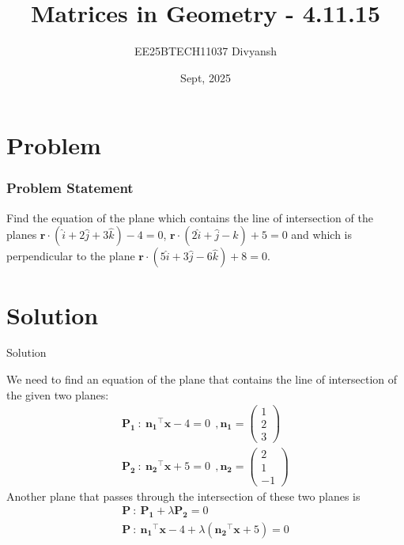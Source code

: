 \documentclass{beamer}
\title{Matrices in Geometry - 4.11.15}
\author{EE25BTECH11037  Divyansh}
\date{Sept, 2025}
\let\vec\mathbf
\providecommand{\brak}[1]{\ensuremath{\left(#1\right)}}
\theoremstyle{remark}
\newcommand{\myvec}[1]{\ensuremath{\begin{pmatrix}#1\end{pmatrix}}}
\begin{document}
\maketitle


\section{Problem}
\begin{frame}
\frametitle{Problem Statement}
Find the equation of the plane which contains the line of intersection of the planes $\vec{r}\cdot\brak{ \hat{i}+2\hat{j} +3\hat{k}}-4=0$, $\vec{r}\cdot \brak{2\hat{i} + \hat{j} - \hat{k}} + 5 = 0$ and which is perpendicular to the plane $\vec{r}\cdot\brak{5\hat{i} +3\hat{j} - 6\hat{k}} +8 = 0.$
\end{frame}

\section{Solution}
\begin{frame}{Solution}
   
We need to find an equation of the plane that contains the line of intersection of the given two planes: 
\begin{align}
\vec{P_1}\  : \ \vec{n_1}^{\top}\vec{x}-4=0 \ \ , \vec{n_1}=\myvec{1 \\ 2 \\ 3 } \\
\vec{P_2} \ : \ \vec{n_2}^{\top}\vec{x}+5=0 \ \ , \vec{n_2}=\myvec{2 \\ 1 \\ -1 }
\end{align}
Another plane that passes through the intersection of these two planes is
\begin{align}
    \vec{P} \ : \ \vec{P_1} + \lambda\vec{P_2}=0 \\ 
    \vec{P} \ : \ \vec{n_1}^{\top}\vec{x}-4 + \lambda\brak{\vec{n_2}^{\top}\vec{x}+5}=0
\end{align}
\end{frame}
\end{document}
